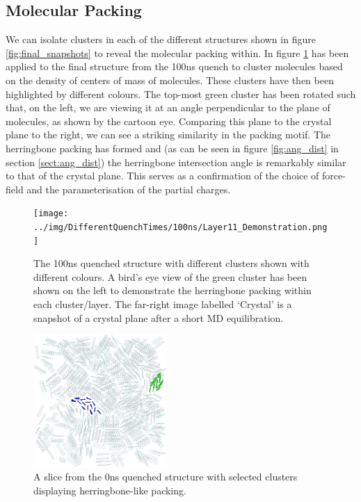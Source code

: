 \subsection{Molecular Packing}
\noindent We can isolate clusters in each of the different structures shown in figure \ref{fig:final_snapshots} to reveal the molecular packing within. In figure \ref{fig:Layer11}  \cite{DBSCAN} has been applied to the final structure from the 100ns quench to cluster molecules based on the density of centers of mass of molecules. These clusters have then been highlighted by different colours. The top-most green cluster has been rotated such that, on the left, we are viewing it at an angle perpendicular to the plane of molecules, as shown by the cartoon eye. Comparing this plane to the crystal plane to the right, we can see a striking similarity in the packing motif. The herringbone packing has formed and (as can be seen in figure \ref{fig:ang_dist} in section \ref{sect:ang_dist}) the herringbone intersection angle is remarkably similar to that of the crystal plane. This serves as a confirmation of the choice of force-field and the parameterisation of the partial charges.
\begin{figure}[ht]
	\texttt{[image: ../img/DifferentQuenchTimes/100ns/Layer11\_Demonstration.png]}
	\caption{\label{fig:Layer11}The 100ns quenched structure with different clusters shown with different colours. A bird's eye view of the green cluster has been shown on the left to demonstrate the herringbone packing within each cluster/layer. The far-right image labelled `Crystal' is a snapshot of a crystal plane after a short MD equilibration.}
\end{figure}
\begin{figure}
	\centering
	\includegraphics[width=0.45\textwidth]{../img/DifferentQuenchTimes/0ns/Slice6_4Clusters.png}
	\caption{\label{fig:ClustInst}A slice from the 0ns quenched structure with  selected clusters displaying herringbone-like packing.}
\end{figure}

